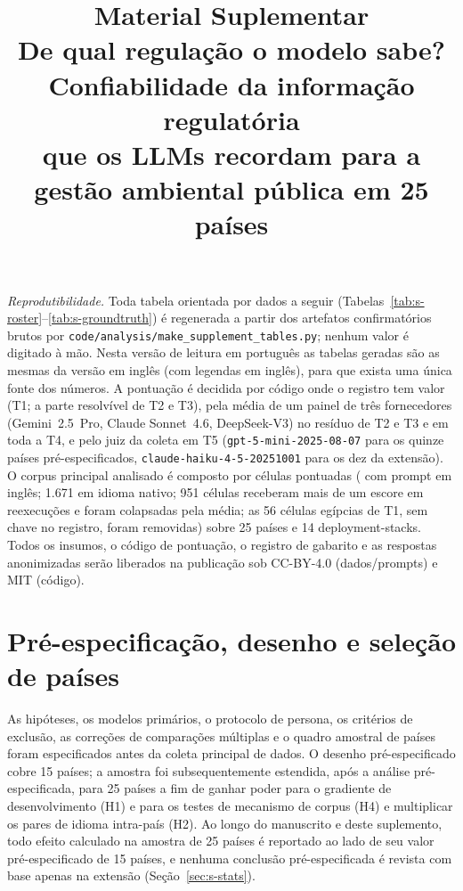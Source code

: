 \documentclass[11pt,a4paper]{article}
\title{Material Suplementar\\[0.3em]
\large De qual regulação o modelo sabe? Confiabilidade da informação regulatória\\
que os LLMs recordam para a gestão ambiental pública em 25 países}
\author{}
\date{}
\begin{document}
\maketitle

\noindent\emph{Reprodutibilidade.} Toda tabela orientada por dados a seguir
(Tabelas~\ref{tab:s-roster}--\ref{tab:s-groundtruth}) é regenerada a partir dos
artefatos confirmatórios brutos por
\texttt{code/analysis/make\_supplement\_tables.py}; nenhum valor é digitado à mão.
Nesta versão de leitura em português as tabelas geradas são as mesmas da versão
em inglês (com legendas em inglês), para que exista uma única fonte dos números.
A pontuação é decidida por código onde o registro tem valor (T1; a parte
resolvível de T2 e T3), pela média de um painel de três fornecedores
(Gemini~2.5~Pro, Claude Sonnet~4.6, DeepSeek-V3) no resíduo de T2 e T3 e em toda a
T4, e pelo juiz da coleta em T5 (\texttt{gpt-5-mini-2025-08-07} para os quinze
países pré-especificados, \texttt{claude-haiku-4-5-20251001} para os dez da
extensão). O corpus principal analisado é composto por \ncellspt{} células
pontuadas (\ncellsenpt{} com prompt em inglês; 1.671 em idioma nativo; 951 células
receberam mais de um escore em reexecuções e foram colapsadas pela média; as 56
células egípcias de T1, sem chave no registro, foram removidas) sobre 25 países e
14 deployment-stacks. Todos os insumos, o código
de pontuação, o registro de gabarito e as respostas anonimizadas serão liberados
na publicação sob CC-BY-4.0 (dados/prompts) e MIT (código).

\tableofcontents

\section{Pré-especificação, desenho e seleção de países}

As hipóteses, os modelos primários, o protocolo de persona, os critérios de
exclusão, as correções de comparações múltiplas e o quadro amostral de países
foram especificados antes da coleta principal de dados. O desenho
pré-especificado cobre 15 países; a amostra foi subsequentemente estendida,
após a análise pré-especificada, para 25 países a fim de ganhar poder para o
gradiente de desenvolvimento (H1) e para os testes de mecanismo de corpus (H4) e
multiplicar os pares de idioma intra-país (H2). Ao longo do manuscrito e deste
suplemento, todo efeito calculado na amostra de 25 países é reportado ao lado de
seu valor pré-especificado de 15 países, e nenhuma conclusão pré-especificada é
revista com base apenas na extensão (Seção~\ref{sec:s-stats}).
\end{document}
